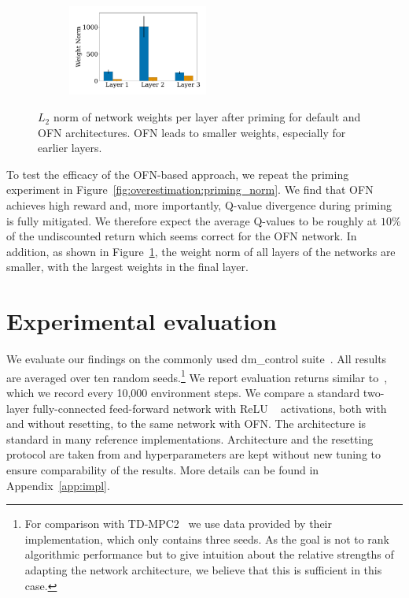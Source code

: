 \begin{figure}[t]
\begin{minipage}[t]{.36\textwidth}
\begin{subfigure}[b]{\textwidth}
    \end{subfigure}
    \\%
    \begin{subfigure}[b]{\textwidth}
        \centering
        \includegraphics[width=4.6cm]{figures/dissecting/priming/weight_magnitudes.pdf}
    \end{subfigure}%
    \caption{$L_2$ norm of network weights per layer after priming for default and OFN  architectures. OFN leads to smaller weights, especially for earlier layers.}
    \label{fig:overestimation:weight_norm}
\end{minipage}
\end{figure}

To test the efficacy of the OFN-based approach, we repeat the priming experiment in Figure~\ref{fig:overestimation:priming_norm}.
We find that OFN achieves high reward and, more importantly, Q-value divergence during priming is fully mitigated. 
We therefore expect the average Q-values to be roughly at $10\%$ of the undiscounted return which seems correct for the OFN network. 
In addition, as shown in Figure~\ref{fig:overestimation:weight_norm}, the weight norm of all layers of the networks are smaller, with the largest weights in the final layer.

\section{Experimental evaluation}

We evaluate our findings on the commonly used \textsf{dm\_control} suite~\parencite{tunyasuvunakool2020dmcontrol}. All results are averaged over ten random seeds.\footnote{For comparison with TD-MPC2~\parencite{hansen2024tdmpc} we use data provided by their implementation, which only contains three seeds. As the goal is not to rank algorithmic performance but to give intuition about the relative strengths of adapting the network architecture, we believe that this is sufficient in this case.} We report evaluation returns similar to~\textcite{nikishin2022primacy}, which we record every 10,000 environment steps. We compare a standard two-layer fully-connected feed-forward network with ReLU ~\parencite{nair2010rectified} activations, both with and without resetting, to the same network with OFN. %
The architecture is standard in many reference implementations. Architecture and the resetting protocol are taken from \textcite{doro2023barrier} and hyperparameters are kept without new tuning to ensure comparability of the results. More details can be found in Appendix~\ref{app:impl}.

